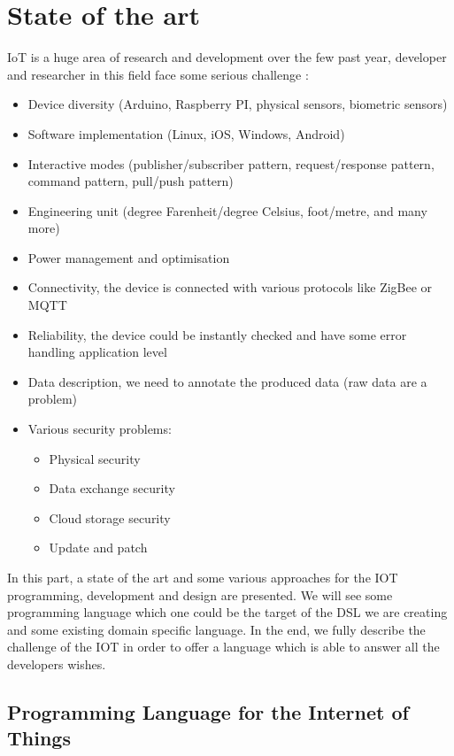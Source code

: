 \chapter{State of the art}

IoT is a huge area of research and development over the few past year,
developer and researcher in this field face some serious challenge
\cite{DBLP:conf/mipro/2015}\cite{Gubbi20131645}\cite{bendickson2016}:

\begin{itemize}
\item Device diversity (Arduino, Raspberry PI, physical sensors, biometric
sensors)
\item Software implementation (Linux, iOS, Windows, Android)
\item Interactive modes (publisher/subscriber pattern, request/response
pattern, command pattern, pull/push pattern)
\item Engineering unit (degree Farenheit/degree Celsius, foot/metre, and
many more)
\item Power management and optimisation
\item Connectivity, the device is connected with various protocols like ZigBee
or MQTT
\item Reliability, the device could be instantly checked and have some error
handling application level
\item Data description, we need to annotate the produced data (raw data are a problem)
\item Various security problems:
  \begin{itemize}
  \item Physical security
  \item Data exchange security
  \item Cloud storage security
  \item Update and patch
  \end{itemize}
\end{itemize}

In this part, a state of the art and some various approaches for the
IOT programming, development and design are presented. We will see some
programming language which one could be the target of the DSL we are creating
and some existing domain specific language. In the end, we fully describe the
challenge of the IOT in order to offer a language which is able to answer all
the developers wishes.

\section{Programming Language for the Internet of Things}
\label{sec:proglang-for-iot}

